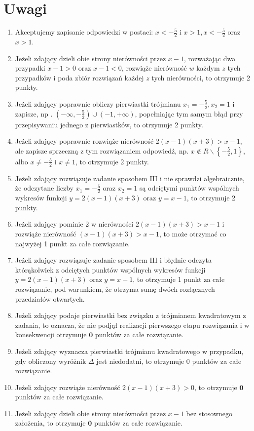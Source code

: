 \documentclass[10pt]{article}
\begin{document}
\section*{Uwagi}
\begin{enumerate}
  \item Akceptujemy zapisanie odpowiedzi w postaci: $x<-\frac{5}{2}$ i $x>1, x<-\frac{5}{2}$ oraz $x>1$.
  \item Jeżeli zdający dzieli obie strony nierówności przez $x-1$, rozważając dwa przypadki $x-1>0$ oraz $x-1<0$, rozwiąże nierówność $w$ każdym $z$ tych przypadków i poda zbiór rozwiązań każdej $z$ tych nierówności, to otrzymuje 2 punkty.
  \item Jeżeli zdający poprawnie obliczy pierwiastki trójmianu $x_{1}=-\frac{5}{2}, x_{2}=1$ i zapisze, np . $\left(-\infty,-\frac{5}{2}\right) \cup(-1,+\infty)$, popełniając tym samym błąd przy przepisywaniu jednego z pierwiastków, to otrzymuje 2 punkty.
  \item Jeżeli zdający poprawnie rozwiąże nierówność $2(x-1)(x+3)>x-1$, ale zapisze sprzeczną z tym rozwiązaniem odpowiedź, np. $x \notin R \backslash\left\{-\frac{5}{2}, 1\right\}$, albo $x \neq-\frac{5}{2}$ i $x \neq 1$, to otrzymuje 2 punkty.
  \item Jeżeli zdający rozwiązuje zadanie sposobem III i nie sprawdzi algebraicznie, że odczytane liczby $x_{1}=-\frac{5}{2}$ oraz $x_{2}=1$ są odciętymi punktów wspólnych wykresów funkcji $y=2(x-1)(x+3)$ oraz $y=x-1$, to otrzymuje 2 punkty.
  \item Jeżeli zdający pominie 2 w nierówności $2(x-1)(x+3)>x-1$ i rozwiąże nierówność $(x-1)(x+3)>x-1$, to może otrzymać co najwyżej 1 punkt za całe rozwiązanie.
  \item Jeżeli zdający rozwiązuje zadanie sposobem III i błędnie odczyta którąkolwiek z odciętych punktów wspólnych wykresów funkcji $y=2(x-1)(x+3)$ oraz $y=x-1$, to otrzymuje 1 punkt za całe rozwiązanie, pod warunkiem, że otrzyma sumę dwóch rozłącznych przedziałów otwartych.
  \item Jeżeli zdający podaje pierwiastki bez związku z trójmianem kwadratowym z zadania, to oznacza, że nie podjął realizacji pierwszego etapu rozwiązania i w konsekwencji otrzymuje $\mathbf{0}$ punktów za całe rozwiązanie.
  \item Jeżeli zdający wyznacza pierwiastki trójmianu kwadratowego w przypadku, gdy obliczony wyróżnik $\Delta$ jest niedodatni, to otrzymuje 0 punktów za całe rozwiązanie.
  \item Jeżeli zdający rozwiąże nierówność $2(x-1)(x+3)>0$, to otrzymuje $\mathbf{0}$ punktów za całe rozwiązanie.
  \item Jeżeli zdający dzieli obie strony nierówności przez $x-1$ bez stosownego założenia, to otrzymuje $\mathbf{0}$ punktów za całe rozwiązanie.
\end{enumerate}
\end{document}

